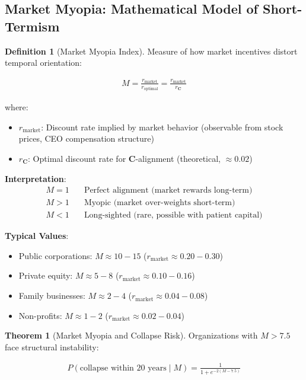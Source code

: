 \documentclass[11pt,a4paper]{article}
\theoremstyle{definition}
\newtheorem{definition}{Definition}[section]
\newtheorem{theorem}{Theorem}[section]
\theoremstyle{remark}
\begin{document}
\begin{enumerate}
\subsection{Market Myopia: Mathematical Model of Short-Termism}

\begin{definition}[Market Myopia Index]
Measure of how market incentives distort temporal orientation:

\begin{align}
M = \frac{r_{\text{market}}}{r_{\text{optimal}}} = \frac{r_{\text{market}}}{r_{\mathbf{C}}}
\end{align}

where:
\begin{itemize}
    \item \(r_{\text{market}}\): Discount rate implied by market behavior (observable from stock prices, CEO compensation structure)
    \item \(r_{\mathbf{C}}\): Optimal discount rate for \(\mathbf{C}\)-alignment (theoretical, \(\approx 0.02\))
\end{itemize}

\textbf{Interpretation}:
\begin{align}
M = 1 &\quad \text{Perfect alignment (market rewards long-term)} \\
M > 1 &\quad \text{Myopic (market over-weights short-term)} \\
M < 1 &\quad \text{Long-sighted (rare, possible with patient capital)}
\end{align}

\textbf{Typical Values}:
\begin{itemize}
    \item Public corporations: \(M \approx 10-15\) (\(r_{\text{market}} \approx 0.20-0.30\))
    \item Private equity: \(M \approx 5-8\) (\(r_{\text{market}} \approx 0.10-0.16\))
    \item Family businesses: \(M \approx 2-4\) (\(r_{\text{market}} \approx 0.04-0.08\))
    \item Non-profits: \(M \approx 1-2\) (\(r_{\text{market}} \approx 0.02-0.04\))
\end{itemize}
\end{definition}

\begin{theorem}[Market Myopia and Collapse Risk]
Organizations with \(M > 7.5\) face structural instability:

\begin{align}
P(\text{collapse within 20 years} \mid M) = \frac{1}{1 + e^{-2(M - 7.5)}}
\end{align}


\end{theorem}
\end{enumerate}
\end{document}
